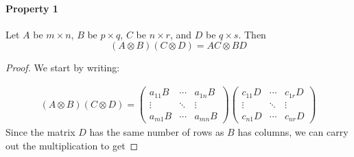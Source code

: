 \documentclass[a4paper,12pt]{scrartcl}
\begin{document}
\paragraph{Property 1} Let $A$ be $m\times n$, $B$ be $p \times q$,
$C$ be $n\times r$, and $D$ be $q \times s$. Then
\begin{equation}
    (A \otimes B)(C \otimes D) = AC \otimes BD
\end{equation}
\begin{proof} We start by writing:

\begin{align*}
    (A \otimes B)(C \otimes D) = 
    \begin{pmatrix} a_{11} B & \cdots & a_{1n} B \\
	\vdots & \ddots & \vdots \\
	a_{m1} B & \cdots & a_{mn}B \end{pmatrix}
    \begin{pmatrix} c_{11} D & \cdots & c_{1r} D \\
	\vdots & \ddots & \vdots \\
	c_{n1} D & \cdots & c_{nr}D \end{pmatrix}
\end{align*}
Since the matrix $D$ has the same number of rows as $B$ has columns,
we can carry out the multiplication to get

\end{proof}



 

\end{document}
